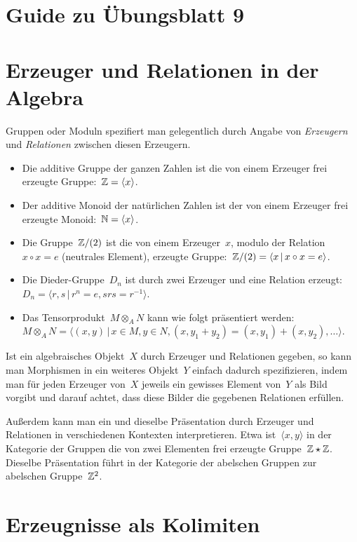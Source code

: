 \documentclass{uebblatt}
\begin{document}
\section*{Guide zu Übungsblatt 9}

\section*{Erzeuger und Relationen in der Algebra}

Gruppen oder Moduln spezifiert man gelegentlich durch Angabe von
\emph{Erzeugern} und \emph{Relationen} zwischen diesen Erzeugern.

\begin{itemize}
\item Die additive Gruppe der ganzen Zahlen ist die von einem Erzeuger frei
erzeugte Gruppe:~$\mathbb{Z} = \langle x \rangle$.
\item Der additive Monoid der natürlichen Zahlen ist der von einem Erzeuger
frei erzeugte Monoid:~$\mathbb{N} = \langle x \rangle$.
\item Die Gruppe~$\mathbb{Z}/(2)$ ist die von einem Erzeuger~$x$, modulo der
Relation~$x \circ x = e$ (neutrales Element), erzeugte Gruppe:~$\mathbb{Z}/(2) =
\langle x \,|\, x \circ x = e \rangle$.
\item Die Dieder-Gruppe~$D_n$ ist durch zwei Erzeuger und eine Relation
erzeugt:~$D_n = \langle r,s \,|\, r^n = e, srs = r^{-1} \rangle$.
\item Das Tensorprodukt~$M \otimes_A N$ kann wie folgt präsentiert werden:~$M
\otimes_A N = \langle (x,y) \,|\, x \in M, y \in N, (x,y_1+y_2) =
(x,y_1)+(x,y_2), \ldots \rangle$.
\end{itemize}

Ist ein algebraisches Objekt~$X$ durch Erzeuger und Relationen gegeben, so kann
man Morphismen in ein weiteres Objekt~$Y$ einfach dadurch spezifizieren, indem
man für jeden Erzeuger von~$X$ jeweils ein gewisses Element von~$Y$ als Bild
vorgibt und darauf achtet, dass diese Bilder die gegebenen Relationen erfüllen.

Außerdem kann man ein und dieselbe Präsentation durch Erzeuger und Relationen
in verschiedenen Kontexten interpretieren. Etwa ist~$\langle x,y \rangle$ in
der Kategorie der Gruppen die von zwei Elementen frei erzeugte Gruppe~$\mathbb{Z}
\star \mathbb{Z}$. Dieselbe Präsentation führt in der Kategorie der abelschen Gruppen
zur abelschen Gruppe~$\mathbb{Z}^2$.


\section*{Erzeugnisse als Kolimiten}
\end{document}
